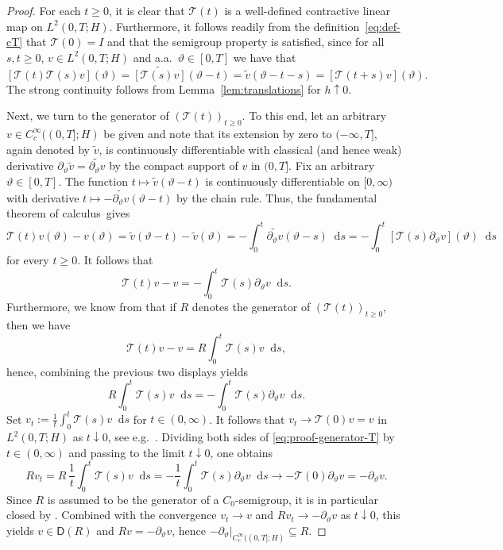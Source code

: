 \documentclass[reqno]{amsart}
\numberwithin{equation}{section}
\newcommand{\cT}{\mathcal{T}}
\newcommand{\rd}{\mathop{}\!\mathrm{d}}
\theoremstyle{remark}
\theoremstyle{definition}
\begin{document}
\begin{proof}
	For each $t \geq 0$, it is clear that $\mathcal T(t)$ 
	is a well-defined contractive linear map on $L^2(0,T;H)$. 
	Furthermore, it follows readily from 
	the definition~\eqref{eq:def-cT} that $\mathcal T(0) = I$ 
	and that the semigroup property is satisfied, 
	since for all $s,t\geq 0$, $v \in L^2(0,T;H)$ 
	and a.a.\ $\vartheta\in[0,T]$ we have that 
	\[ 
	[\mathcal T(t)\mathcal T(s)v](\vartheta) 
	= \widetilde{[\mathcal T(s)v]}(\vartheta-t) 
	= \widetilde v(\vartheta-t-s)
	= 
	[\mathcal T(t+s)v](\vartheta).
	\] 
	The strong continuity follows 
	from 
	Lemma~\ref{lem:translations} 
	for $h \uparrow 0$. 
	
	Next, we turn to  
	the generator of $(\mathcal T(t))_{t\geq 0}$. 
	To this end, let an arbitrary ${v \in C_{c}^\infty((0,T];H)}$ 
	be given and note that its extension 
	by zero to $(-\infty,T]$, again denoted by $\widetilde v$, 
	is continuously differentiable 
	with classical (and hence weak) derivative 
	${\partial_\vartheta \widetilde v = \widetilde{\partial_\vartheta v}}$ 
	by the compact support of $v$ in $(0,T]$. 
	Fix an arbitrary $\vartheta\in[0,T]$. 
	The function $t \mapsto \widetilde v(\vartheta-t)$ 
	is continuously differentiable on $[0,\infty)$ 
	with derivative $t \mapsto -\widetilde{\partial_\vartheta v}(\vartheta-t)$ 
	by the chain rule. 
	Thus, the fundamental theorem of calculus~gives 
	\[
	\mathcal T(t)v(\vartheta) - v(\vartheta) 
	= \widetilde v(\vartheta-t) - \widetilde v(\vartheta)
	= -\int_0^t \widetilde{\partial_\vartheta v}(\vartheta-s) \rd s
	= -\int_0^t [\mathcal T(s)\partial_\vartheta v](\vartheta) \rd s
	\]
	for every $t \geq 0$.
	It follows that 
	\[ 
	\mathcal T(t)v-v = -\int_0^t \mathcal T(s)\partial_\vartheta v \rd s.
	\] 
	Furthermore, 
	we know from \cite[Chapter~1, Theorem~2.4(b)]{Pazy1983} 
	that if $R$ denotes the generator of $(\mathcal T(t))_{t\ge0}$, 
	then we have 
	\[
	\mathcal T(t)v-v=R \int_0^t \mathcal T(s)v \rd s,
	\]
	hence, combining the previous two displays yields 
	\begin{equation}\label{eq:proof-generator-T}
	R \int_0^t \mathcal T(s)v \rd s 
	= 
	-\int_0^t \mathcal T(s)\partial_\vartheta v\rd s. 
	\end{equation}
	Set $v_t := \frac{1}{t}\int_0^t \cT(s)v \rd s$ for $t \in (0,\infty)$. 
	It follows that $v_t \to \cT(0)v = v$ in $L^2(0,T;H)$ 
	as $t \downarrow 0$, 
	see e.g.\ \cite[Chapter~1, Theorem~2.4(a)]{Pazy1983}. 
	Dividing both sides of \eqref{eq:proof-generator-T} 
	by $t \in (0,\infty)$ and passing to the limit $t \downarrow 0$, 
	one obtains
	\[
	Rv_t 
	= 
	R \, \frac{1}{t}\int_0^t \mathcal T(s)v \rd s 
	= 
	- \frac{1}{t}\int_0^t \mathcal T(s)\partial_\vartheta v\rd s \to 
	- \mathcal T(0)\partial_\vartheta v = -\partial_\vartheta v.
	\] 
	Since $R$ is assumed to be the generator of a $C_0$-semigroup, 
	it is in particular closed by \cite[Proposition~II.1.4]{Engel1999}. 
	Combined with the convergence 
	$v_t \to v$ and $Rv_t \to -\partial_\vartheta v$ 
	as $t \downarrow 0$, 
	this yields $v \in \mathsf D(R)$ and ${Rv = -\partial_\vartheta v}$, 
	hence $-\partial_\vartheta|_{C_c^\infty((0,T];H)} \subseteq R$.
	

\end{proof}
\end{document}
